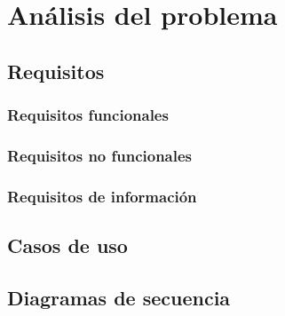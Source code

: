 \chapter{Análisis del problema}

\section{Requisitos}

\subsection{Requisitos funcionales}

\subsection{Requisitos no funcionales}

\subsection{Requisitos de información}

\section{Casos de uso}

\section{Diagramas de secuencia}
